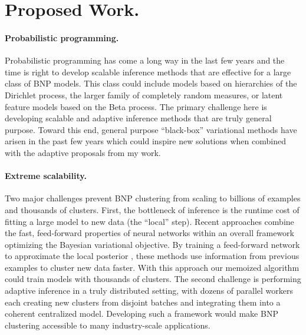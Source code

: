 \documentclass[11pt,letterpaper,sans]{article}
\begin{document}
\section{Proposed Work.}

\paragraph{Probabilistic programming.}
Probabilistic programming has come a long way in the last few years and the time is right to develop scalable inference methods that are effective for a large class of BNP models. This class could include models based on hierarchies of the Dirichlet process, the larger family of completely random measures, or latent feature models based on the Beta process. The primary challenge here is developing scalable and adaptive inference methods that are truly general purpose. Toward this end, general purpose ``black-box'' variational methods \cite{kucukelbir:Stan, ranganath:blackbox} have arisen in the past few years which could inspire new solutions when combined with the adaptive proposals from my work.

\paragraph{Extreme scalability.}
Two major challenges prevent BNP clustering from scaling to billions of examples and thousands of clusters. First, the bottleneck of inference is the runtime cost of fitting a large model to new data (the ``local'' step). Recent approaches  \cite{mnih:neuralVariational} combine the fast, feed-forward properties of neural networks within an overall framework optimizing the Bayesian variational objective. By training a feed-forward network to approximate the local posterior \cite{gan:deepTSBN}, these methods use information from previous examples to cluster new data faster. With this approach our memoized algorithm could train models with thousands of clusters. The second challenge is performing adaptive inference in a truly distributed setting, with dozens of parallel workers each creating new clusters from disjoint batches and integrating them into a coherent centralized model. Developing such a framework would make BNP clustering accessible to many industry-scale applications.
\end{document}
